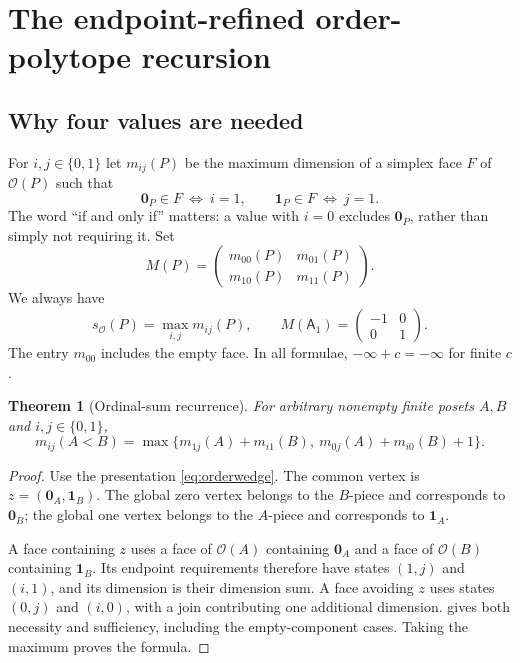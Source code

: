 \documentclass[11pt]{article}
\newtheorem{theorem}{Theorem}[section]
\theoremstyle{definition}
\newcommand{\OO}{\mathcal O}
\newcommand{\sO}{s_{\OO}}
\newcommand{\one}{\mathbf 1}
\newcommand{\zero}{\mathbf 0}
\newcommand{\A}[1]{\mathsf A_{#1}}
\begin{document}
\section{The endpoint-refined order-polytope recursion}\label{sec:order}

\subsection{Why four values are needed}
For $i,j\in\{0,1\}$ let $m_{ij}(P)$ be the maximum dimension of a simplex face $F$ of $\OO(P)$ such that
\[
\zero_P\in F\ \Longleftrightarrow\ i=1,
\qquad
\one_P\in F\ \Longleftrightarrow\ j=1.
\]
The word ``if and only if'' matters: a value with $i=0$ excludes $\zero_P$, rather than simply not requiring it. Set
\begin{equation}\label{eq:matrix}
M(P)=\begin{pmatrix}m_{00}(P)&m_{01}(P)\\m_{10}(P)&m_{11}(P)\end{pmatrix}.
\end{equation}
We always have
\[
\sO(P)=\max_{i,j}m_{ij}(P),\qquad
M(\A1)=\begin{pmatrix}-1&0\\0&1\end{pmatrix}.
\]
The entry $m_{00}$ includes the empty face. In all formulae, $-\infty+c=-\infty$ for finite $c$.

\begin{theorem}[Ordinal-sum recurrence]\label{thm:orderseries}
For arbitrary nonempty finite posets $A,B$ and $i,j\in\{0,1\}$,
\begin{equation}\label{eq:orderseries}
\boxed{m_{ij}(A<B)=
\max\{m_{1j}(A)+m_{i1}(B),\ m_{0j}(A)+m_{i0}(B)+1\}.}
\end{equation}
\end{theorem}
\begin{proof}
Use the presentation \eqref{eq:orderwedge}. The common vertex is $z=(\zero_A,\one_B)$. The global zero vertex belongs to the $B$-piece and corresponds to $\zero_B$; the global one vertex belongs to the $A$-piece and corresponds to $\one_A$.

A face containing $z$ uses a face of $\OO(A)$ containing $\zero_A$ and a face of $\OO(B)$ containing $\one_B$. Its endpoint requirements therefore have states $(1,j)$ and $(i,1)$, and its dimension is their dimension sum. A face avoiding $z$ uses states $(0,j)$ and $(i,0)$, with a join contributing one additional dimension.  gives both necessity and sufficiency, including the empty-component cases. Taking the maximum proves the formula.
\end{proof}
\end{document}
